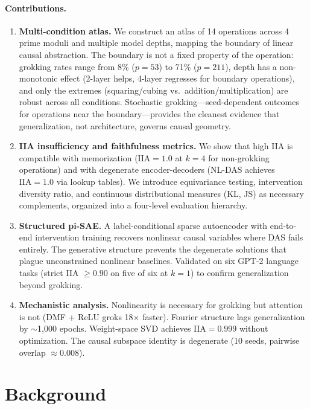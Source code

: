\documentclass{article}
\newcommand{\IIA}{\mathrm{IIA}}
\begin{document}
\paragraph{Contributions.}
\begin{enumerate}[leftmargin=*]
\item \textbf{Multi-condition atlas.} We construct an atlas of 14 operations
  across 4 prime moduli and multiple model depths,
  mapping the boundary of linear causal abstraction. The boundary is not a
  fixed property of the operation: grokking rates range from 8\% ($p{=}53$)
  to 71\% ($p{=}211$), depth has a non-monotonic effect (2-layer helps,
  4-layer regresses for boundary operations), and only the
  extremes (squaring/cubing vs.\ addition/multiplication) are robust across
  all conditions. Stochastic grokking---seed-dependent outcomes for
  operations near the boundary---provides the cleanest evidence that
  generalization, not architecture, governs causal geometry.
\item \textbf{IIA insufficiency and faithfulness metrics.} We show that
  high IIA is compatible with memorization ($\IIA = 1.0$ at $k{=}4$ for
  non-grokking operations) and with degenerate encoder-decoders (NL-DAS
  achieves $\IIA = 1.0$ via lookup tables). We introduce equivariance
  testing, intervention diversity ratio, and continuous distributional
  measures (KL, JS) as necessary complements, organized into a four-level
  evaluation hierarchy.
\item \textbf{Structured pi-SAE.} A label-conditional sparse autoencoder
  with end-to-end intervention training recovers nonlinear causal
  variables where DAS fails entirely. The generative structure prevents
  the degenerate solutions that plague unconstrained nonlinear baselines.
  Validated on six GPT-2 language tasks (strict IIA $\geq 0.90$ on five
  of six at $k{=}1$) to confirm generalization beyond grokking.
\item \textbf{Mechanistic analysis.} Nonlinearity is necessary for grokking
  but attention is not (DMF + ReLU groks 18$\times$ faster). Fourier
  structure lags generalization by $\sim$1{,}000 epochs. Weight-space SVD
  achieves $\IIA = 0.999$ without optimization. The causal subspace identity
  is degenerate (10 seeds, pairwise overlap $\approx 0.008$).
\end{enumerate}


\section{Background}
\label{sec:background}
\end{document}
